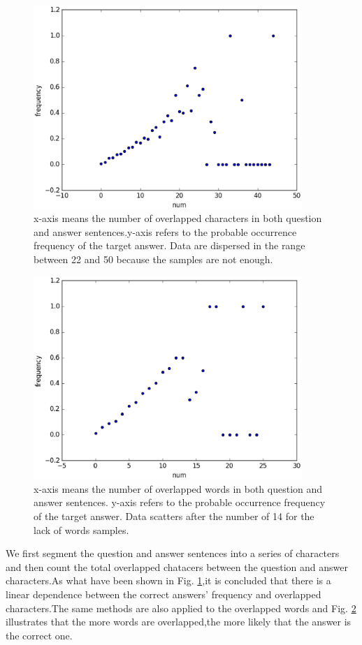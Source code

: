 \documentclass{llncs}
\begin{document}

\begin{figure}[htb]
\centering
\includegraphics[width=4in]{figures/character_overlap.eps}
\caption{x-axis means the number of overlapped characters in both question and answer sentences.y-axis refers to the probable occurrence frequency of the target answer. Data are dispersed in the range between 22 and 50 because the samples are not enough.}
\label{fig:character_overlap}
\end{figure}


\begin{figure}
\centering
\includegraphics[width=4in]{figures/word_overlap.eps}
\caption{x-axis means the number of overlapped words in both question and answer sentences. y-axis refers to the probable occurrence frequency of the target answer. Data scatters after the number of 14 for the lack of words samples.}
\label{fig:word_overlap}
\end{figure}

We first segment the question and answer sentences into a series of characters and then count the total overlapped chatacers between the question and answer characters.As what have been shown in Fig. \ref{fig:character_overlap},it is concluded that there is a linear dependence between the correct answers’ frequency and overlapped characters.The same methods are also applied to the overlapped words and Fig. \ref{fig:word_overlap} illustrates that the more words are overlapped,the more likely that the answer is the correct one.
\end{document}

